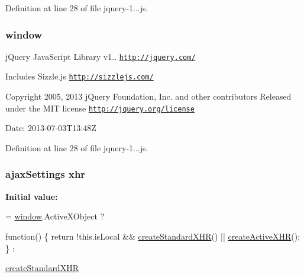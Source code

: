 Definition at line 28 of file jquery-\/1...\+js.

\subsubsection[{\texorpdfstring{window}{window}}]{\setlength{\rightskip}{0pt plus 5cm}window}\hypertarget{obj_2_release_2_package_2_package_tmp_2_scripts_2jquery-1_810_82_8js_a04a8a2bbfa9c15500892b8e5033d625b}{}\label{obj_2_release_2_package_2_package_tmp_2_scripts_2jquery-1_810_82_8js_a04a8a2bbfa9c15500892b8e5033d625b}
j\+Query Java\+Script Library v1.. \href{http://jquery.com/}{\tt http\+://jquery.\+com/}

Includes Sizzle.\+js \href{http://sizzlejs.com/}{\tt http\+://sizzlejs.\+com/}

Copyright 2005, 2013 j\+Query Foundation, Inc. and other contributors Released under the M\+IT license \href{http://jquery.org/license}{\tt http\+://jquery.\+org/license}

Date\+: 2013-\/07-\/03\+T13\+:48Z 

Definition at line 28 of file jquery-\/1...\+js.

\subsubsection[{\texorpdfstring{xhr}{xhr}}]{ ajax\+Settings xhr}\hypertarget{obj_2_release_2_package_2_package_tmp_2_scripts_2jquery-1_810_82_8js_a0b7a5cb538ca9913b1b3b1c807ad06f0}{}\label{obj_2_release_2_package_2_package_tmp_2_scripts_2jquery-1_810_82_8js_a0b7a5cb538ca9913b1b3b1c807ad06f0}
{\bfseries Initial value\+:}
\begin{DoxyCode}
= \hyperlink{obj_2_release_2_package_2_package_tmp_2_scripts_2jquery-1_810_82_8js_a04a8a2bbfa9c15500892b8e5033d625b}{window}.ActiveXObject ?
    
    \textcolor{keyword}{function}() \{
        \textcolor{keywordflow}{return} !this.isLocal && \hyperlink{obj_2_release_2_package_2_package_tmp_2_scripts_2jquery-1_810_82_8js_acea019a8b67e4d114deb75d1e0b3474a}{createStandardXHR}() || 
      \hyperlink{obj_2_release_2_package_2_package_tmp_2_scripts_2jquery-1_810_82_8js_a54bf63f1b5f905292db45a1d6a9dc300}{createActiveXHR}();
    \} :
    
    \hyperlink{obj_2_release_2_package_2_package_tmp_2_scripts_2jquery-1_810_82_8js_acea019a8b67e4d114deb75d1e0b3474a}{createStandardXHR}
\end{DoxyCode}


